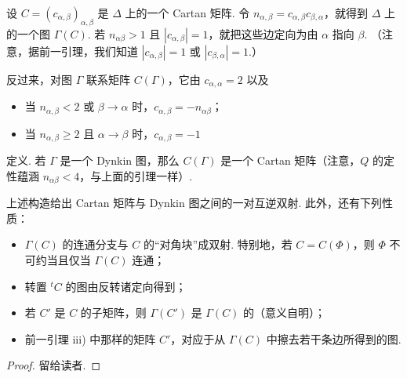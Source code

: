 设 $C=(c_{\alpha,\beta})_{\alpha,\beta}$ 是 $\Delta$ 上的一个 Cartan 矩阵. 令 $n_{\alpha,\beta}=c_{\alpha,\beta}c_{\beta,\alpha}$，就得到 $\Delta$ 上的一个图 $\Gamma(C)$. 若 $n_{\alpha\beta}>1$ 且 $|c_{\alpha,\beta}|=1$，就把这些边定向为由 $\alpha$ 指向 $\beta$. （注意，据前一引理，我们知道 $|c_{\alpha,\beta}|=1$ 或 $|c_{\beta,\alpha}|=1$.）

反过来，对图 $\Gamma$ 联系矩阵 $C(\Gamma)$，它由 $c_{\alpha,\alpha}=2$ 以及
\begin{itemize}
\item 当 $n_{\alpha,\beta}<2$ 或 $\beta\to\alpha$ 时，$c_{\alpha,\beta}=-n_{\alpha\beta}$；
\item 当 $n_{\alpha,\beta}\geqslant 2$ 且 $\alpha\to\beta$ 时，$c_{\alpha,\beta}=-1$
\end{itemize}
定义. 若 $\Gamma$ 是一个 Dynkin 图，那么 $C(\Gamma)$ 是一个 Cartan 矩阵（注意，$Q$ 的定性蕴涵 $n_{\alpha\beta}<4$，与上面的引理一样）.
\begin{lemma*}
上述构造给出 Cartan 矩阵与 Dynkin 图之间的一对互逆双射. 此外，还有下列性质：
\begin{itemize}
\item $\Gamma(C)$ 的连通分支与 $C$ 的``对角块''成双射. 特别地，若 $C=C(\Phi)$，则 $\Phi$ 不可约当且仅当 $\Gamma(C)$ 连通；
\item 转置 ${}^{t}C$ 的图由反转诸定向得到；
\item 若 $C'$ 是 $C$ 的子矩阵，则 $\Gamma(C')$ 是 $\Gamma(C)$ 的（意义自明）；
\item 前一引理 iii) 中那样的矩阵 $C'$，对应于从 $\Gamma(C)$ 中擦去若干条边所得到的图.
\end{itemize}
\end{lemma*}
\begin{proof}
留给读者.
\end{proof}
